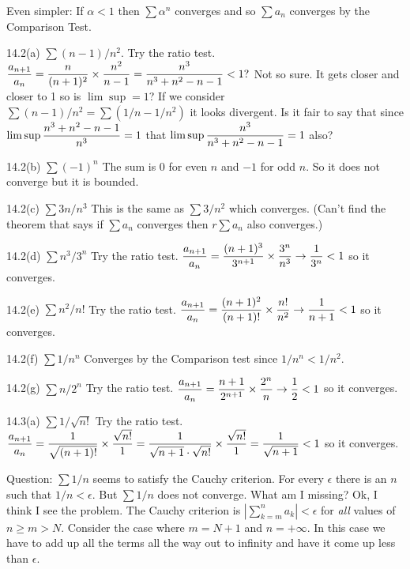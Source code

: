 \bigskip

Even simpler: If $\alpha<1$ then $\sum \alpha^n$ converges
and so $\sum a_n$ converges by the Comparison Test.

\bigskip

14.2(a) $\sum(n-1)/n^2$. Try the ratio test.
\medskip
$\displaystyle{
{a_{n+1}\over a_n}
={n\over(n+1)^2}\times{n^2\over n-1}
={n^3\over n^3+n^2-n-1}<1?
}$
\medskip
Not so sure. It gets closer and closer to 1 so is $\lim\sup=1$?
If we consider $\sum(n-1)/n^2=\sum(1/n-1/n^2)$ it looks divergent.
Is it fair to say that since
\medskip
$\displaystyle{\lim\sup{n^3+n^2-n-1\over n^3}=1}$ that
$\displaystyle{\lim\sup{n^3\over n^3+n^2-n-1}=1}$ also?

\bigskip

14.2(b) $\sum(-1)^n$ The sum is 0 for even $n$ and $-1$ for odd $n$.
So it does not converge but it is bounded.

\bigskip

14.2(c) $\sum3n/n^3$ This is the same as $\sum3/n^2$ which converges.
(Can't find the theorem that says if $\sum a_n$ converges then
$r\sum a_n$ also converges.)

\bigskip

14.2(d) $\sum n^3/3^n$ Try the ratio test.
\medskip
$\displaystyle{
{a_{n+1}\over a_n}
={(n+1)^3\over3^{n+1}}\times{3^n\over n^3}
\rightarrow{1\over3^n}<1
}$ so it converges.

\bigskip

14.2(e) $\sum n^2/n!$ Try the ratio test.
\medskip
$\displaystyle{
{a_{n+1}\over a_n}
={(n+1)^2\over(n+1)!}\times{n!\over n^2}
\rightarrow{1\over n+1}<1}$ so it converges.

\bigskip

14.2(f) $\sum1/n^n$ Converges by the Comparison test since $1/n^n<1/n^2$.

\bigskip

14.2(g) $\sum n/2^n$ Try the ratio test.
\medskip
$\displaystyle{
{a_{n+1}\over a_n}
={n+1\over2^{n+1}}\times{2^n\over n}
\rightarrow{1\over2}<1}$ so it converges.

\bigskip

14.3(a) $\sum1/\sqrt{n!}$ Try the ratio test.
\medskip
$\displaystyle{
{a_{n+1}\over a_n}
={1\over\sqrt{(n+1)!}}\times{\sqrt{n!}\over1}
={1\over\sqrt{n+1}\cdot\sqrt{n!}}\times{\sqrt{n!}\over1}
={1\over\sqrt{n+1}}<1}$ so it converges.


Question: $\sum1/n$ seems to satisfy the Cauchy criterion.
For every $\epsilon$ there is an $n$ such that $1/n<\epsilon$.
But $\sum1/n$ does not converge.
What am I missing?
Ok, I think I see the problem.
The Cauchy criterion is
$|\sum_{k=m}^n a_k|<\epsilon$ for {\it all} values of $n\ge m>N$.
Consider the case where $m=N+1$ and $n=+\infty$.
In this case we have to add up
all the terms all the way out to infinity and have it come up less than
$\epsilon$.

